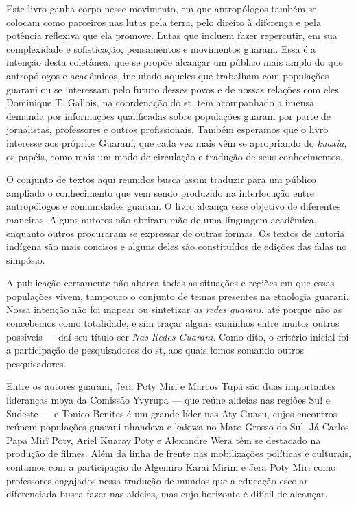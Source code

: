 Este livro ganha corpo nesse movimento, em que antropólogos também se
colocam como parceiros nas lutas pela terra, pelo direito à diferença e
pela potência reflexiva que ela promove. Lutas que incluem fazer
repercutir, em sua complexidade e sofisticação, pensamentos e
movimentos guarani. Essa é a intenção desta coletânea, que se propõe
alcançar um público mais amplo do que antropólogos e acadêmicos,
incluindo aqueles que trabalham com populações guarani ou se interessam
pelo futuro desses povos e de nossas relações com eles. Dominique T.
Gallois, na coordenação do st, tem acompanhado a imensa demanda por
informações qualificadas sobre populações guarani por
parte de jornalistas, professores e outros profissionais. Também esperamos que
o livro interesse aos próprios Guarani, que cada vez mais vêm se
apropriando do \emph{kuaxia}, os papéis, como mais um modo de circulação e
tradução de seus conhecimentos.

O conjunto de textos aqui reunidos busca assim traduzir para um público
ampliado o conhecimento que vem sendo produzido na interlocução entre
antropólogos e comunidades guarani. O livro alcança esse objetivo de
diferentes maneiras. Alguns autores não abriram mão de uma linguagem
acadêmica, enquanto outros procuraram se expressar de outras formas. Os
textos de autoria indígena são mais concisos e alguns deles são constituídos de
edições das falas no simpósio. 

A publicação certamente não abarca todas as situações e regiões em que
essas populações vivem, tampouco o conjunto de temas presentes na
etnologia guarani. Nossa intenção não foi mapear ou sintetizar \emph{as redes
guarani}, até porque não as concebemos como totalidade, e sim traçar
alguns caminhos entre muitos outros possíveis --- daí seu título ser \emph{Nas
Redes Guarani}. Como dito, o critério inicial foi a participação de
pesquisadores do st, aos quais fomos somando outros pesquisadores. 

Entre os autores guarani, Jera Poty Miri e Marcos Tupã são duas
importantes lideranças mbya da Comissão Yvyrupa --- que reúne aldeias nas
regiões Sul e Sudeste --- e Tonico Benites é um grande líder nas Aty
Guasu, cujos encontros reúnem populações guarani nhandeva e kaiowa no
Mato Grosso do Sul. Já Carlos Papa Mirĩ Poty, Ariel Kuaray Poty e
Alexandre Wera têm se destacado na produção de filmes. Além da linha de
frente nas mobilizações políticas e culturais, contamos com a
participação de Algemiro Karai Mirim e Jera Poty Miri como professores
engajados nessa tradução de mundos que a educação escolar diferenciada
busca fazer nas aldeias, mas cujo horizonte é difícil de alcançar.

